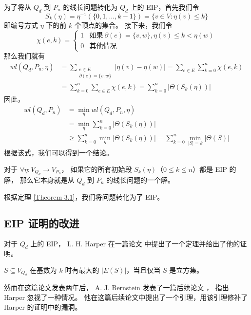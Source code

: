 为了将从 $Q_d$ 到 $P_n$ 的线长问题转化为 $Q_d$ 上的 EIP，首先我们令
\begin{equation*}
S_k(\eta) = \eta^{-1}(\{0, 1, \dots, k - 1\}) = \{v \in V \colon \eta(v) \le k\}
\end{equation*}
即编号方式 $\eta$ 下的前 $k$ 个顶点的集合。
接下来，我们令
\begin{equation*}
\chi(e, k) = \begin{cases}
	1 & \text{如果}\ \partial(e) = \{v, w\}, \eta(v) \le k < \eta(w) \\
	0 & \text{其他情况}
\end{cases}
\end{equation*}
那么我们就有
\begin{align*}
wl(Q_d, P_n, \eta) & = \sum_{\substack{
			       e \in E \\
			       \partial(e) = \{v, w\}
		       }} |\eta(v) - \eta(w)|
		     = \sum_{e \in E} \sum_{k = 0}^n \chi(e, k) \\
		   & = \sum_{k = 0}^n \sum_{e \in E} \chi(e, k)
		     = \sum_{k = 0}^n |\Theta(S_k(\eta))|
\end{align*}
因此，
\begin{align*}
wl(Q_d, P_n) & = \min_{\eta} wl(Q_d, P_n, \eta) \\
	     & = \min_{\eta} \sum_{k = 0}^n |\Theta(S_k(\eta))| \\
	     & \ge \sum_{k = 0}^n \min_{\eta} |\Theta(S_k(\eta))|
	       = \sum_{k = 0}^n \min_{|S| = k} |\Theta(S)|
\end{align*}
根据该式，我们可以得到一个结论。

\begin{theorem}
\label{Theorem 3.1}
对于 $\forall \eta \colon V_{Q_d} \rightarrow V_{P_n}$，
如果它的所有初始段 $S_k(\eta)$（$0 \le k \le n$）都是 EIP 的解，
那么它本身就是从 $Q_d$ 到 $P_n$ 的线长问题的一个解。
\end{theorem}

根据定理 \ref{Theorem 3.1}，我们将问题转化为了 EIP。

\subsection{EIP 证明的改进}
\label{Subsection 3.1.3}

对于 $Q_d$ 上的 EIP，
L. H. Harper 在一篇论文 \cite{Harper.1964} 中提出了一个定理并给出了他的证明。

\begin{theorem}
$S \subseteq V_{Q_d}$ 在基数为 $k$ 时有最大的 $|E(S)|$，当且仅当 $S$ 是立方集。
\end{theorem}

然而在这篇论文发表两年后，
A. J. Bernstein 发表了一篇后续论文 \cite{Bernstein.1967}，
指出 Harper 忽视了一种情况。
他在这篇后续论文中提出了一个引理，用该引理修补了 Harper 的证明中的漏洞。
